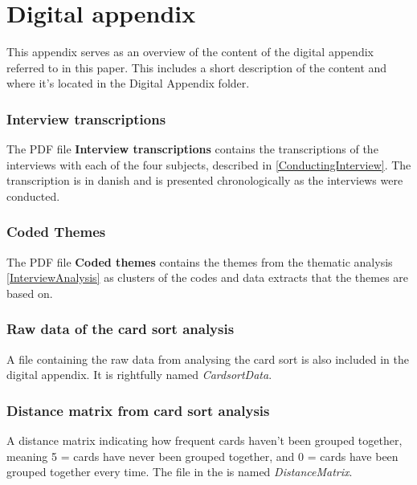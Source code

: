 \chapter{Digital appendix}
\label{DigitalAppendix}
%
This appendix serves as an overview of the content of the digital appendix referred to in this paper. This includes a short description of the content and where it's located in the Digital Appendix folder. 

\subsection*{Interview transcriptions}
%
The PDF file \textbf{Interview transcriptions} contains the transcriptions of the interviews with each of the four subjects, described in \autoref{ConductingInterview}. The transcription is in danish and is presented chronologically as the interviews were conducted.

\subsection*{Coded Themes}
% 
The PDF file \textbf{Coded themes} contains the themes from the thematic analysis \autoref{InterviewAnalysis} as clusters of the codes and data extracts that the themes are based on.

\subsection*{Raw data of the card sort analysis}
%
A file containing the raw data from analysing the card sort is also included in the digital appendix. It is rightfully named \textit{CardsortData}.

\subsection{Distance matrix from card sort analysis}
%
A distance matrix indicating how frequent cards haven't been grouped together, meaning 5 = cards have never been grouped together, and  0 = cards have been grouped together every time. The file in the is named \textit{DistanceMatrix}.